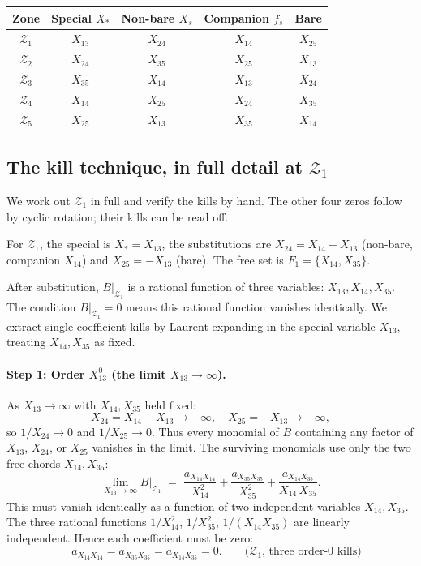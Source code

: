\documentclass[11pt]{article}
\newcommand{\X}[2]{X_{#1#2}}
\newcommand{\Z}{\mathcal{Z}}
\theoremstyle{definition}
\begin{document}
\begin{center}
\renewcommand{\arraystretch}{1.2}
\begin{tabular}{c|c|c|c|c}
\toprule
Zone & Special $X_*$ & Non-bare $X_s$ & Companion $f_s$ & Bare \\
\midrule
$\Z_1$ & $\X{1}{3}$ & $\X{2}{4}$ & $\X{1}{4}$ & $\X{2}{5}$ \\
$\Z_2$ & $\X{2}{4}$ & $\X{3}{5}$ & $\X{2}{5}$ & $\X{1}{3}$ \\
$\Z_3$ & $\X{3}{5}$ & $\X{1}{4}$ & $\X{1}{3}$ & $\X{2}{4}$ \\
$\Z_4$ & $\X{1}{4}$ & $\X{2}{5}$ & $\X{2}{4}$ & $\X{3}{5}$ \\
$\Z_5$ & $\X{2}{5}$ & $\X{1}{3}$ & $\X{3}{5}$ & $\X{1}{4}$ \\
\bottomrule
\end{tabular}
\end{center}

\subsection{The kill technique, in full detail at \texorpdfstring{$\Z_1$}{Z1}}

We work out $\Z_1$ in full and verify the kills by hand. The other four
zeros follow by cyclic rotation; their kills can be read off.

For $\Z_1$, the special is $X_*=\X{1}{3}$, the substitutions are
$\X{2}{4}=\X{1}{4}-\X{1}{3}$ (non-bare, companion $\X{1}{4}$) and
$\X{2}{5}=-\X{1}{3}$ (bare). The free set is $F_1=\{\X{1}{4},\X{3}{5}\}$.

After substitution, $B|_{\Z_1}$ is a rational function of three variables:
$\X{1}{3},\X{1}{4},\X{3}{5}$. The condition $B|_{\Z_1}=0$ means this
rational function vanishes identically. We extract single-coefficient
kills by Laurent-expanding in the special variable $\X{1}{3}$, treating
$\X{1}{4},\X{3}{5}$ as fixed.

\paragraph{Step 1: Order $\X{1}{3}^0$ (the limit $\X{1}{3}\to\infty$).}

As $\X{1}{3}\to\infty$ with $\X{1}{4},\X{3}{5}$ held fixed:
\[
\X{2}{4}=\X{1}{4}-\X{1}{3}\to-\infty,\quad \X{2}{5}=-\X{1}{3}\to-\infty,
\]
so $1/\X{2}{4}\to 0$ and $1/\X{2}{5}\to 0$. Thus every monomial of $B$
containing any factor of $\X{1}{3}$, $\X{2}{4}$, or $\X{2}{5}$ vanishes in
the limit. The surviving monomials use only the two free chords $\X{1}{4},\X{3}{5}$:
\[
\lim_{\X{1}{3}\to\infty} B|_{\Z_1}
\;=\;
\frac{a_{\X{1}{4}\X{1}{4}}}{\X{1}{4}^2} +
\frac{a_{\X{3}{5}\X{3}{5}}}{\X{3}{5}^2} +
\frac{a_{\X{1}{4}\X{3}{5}}}{\X{1}{4}\,\X{3}{5}}.
\]
This must vanish identically as a function of two independent variables
$\X{1}{4},\X{3}{5}$. The three rational functions $1/\X{1}{4}^2$, $1/\X{3}{5}^2$,
$1/(\X{1}{4}\X{3}{5})$ are linearly independent. Hence each coefficient must be zero:
\[
\boxed{\quad a_{\X{1}{4}\X{1}{4}}=a_{\X{3}{5}\X{3}{5}}=a_{\X{1}{4}\X{3}{5}}=0.\quad}
\quad\text{($\Z_1$, three order-0 kills)}
\]
\end{document}

